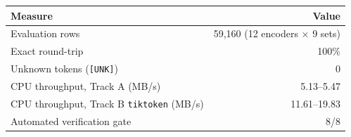 
\begin{tabular}{lr}
\toprule
\textbf{Measure} & \textbf{Value} \\
\midrule
Evaluation rows & 59,160 (12 encoders $\times$ 9 sets) \\
Exact round-trip & 100\% \\
Unknown tokens (\texttt{[UNK]}) & 0 \\
CPU throughput, Track A (MB/s) & 5.13--5.47 \\
CPU throughput, Track B \texttt{tiktoken} (MB/s) & 11.61--19.83\\
Automated verification gate & 8/8 \\
\bottomrule
\end{tabular}
